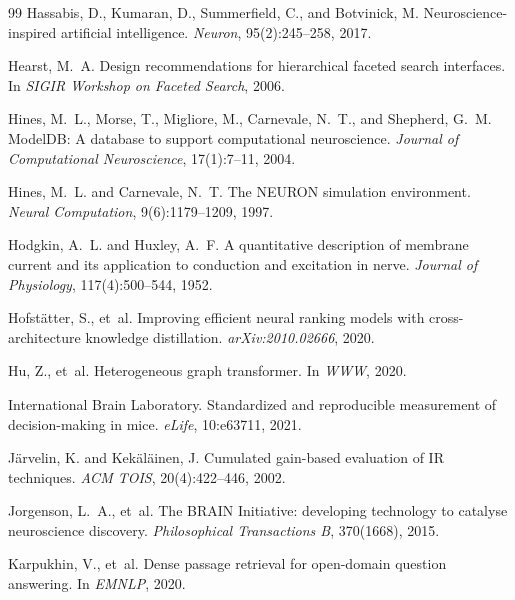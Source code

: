 \documentclass{article}
\theoremstyle{definition}
\begin{document}
\begin{thebibliography}{99}
Hassabis, D., Kumaran, D., Summerfield, C., and Botvinick, M.
\newblock Neuroscience-inspired artificial intelligence.
\newblock \emph{Neuron}, 95(2):245--258, 2017.

Hearst, M.~A.
\newblock Design recommendations for hierarchical faceted search interfaces.
\newblock In \emph{SIGIR Workshop on Faceted Search}, 2006.

Hines, M.~L., Morse, T., Migliore, M., Carnevale, N.~T., and Shepherd, G.~M.
\newblock ModelDB: A database to support computational neuroscience.
\newblock \emph{Journal of Computational Neuroscience}, 17(1):7--11, 2004.

Hines, M.~L. and Carnevale, N.~T.
\newblock The NEURON simulation environment.
\newblock \emph{Neural Computation}, 9(6):1179--1209, 1997.

Hodgkin, A.~L. and Huxley, A.~F.
\newblock A quantitative description of membrane current and its application to conduction and excitation in nerve.
\newblock \emph{Journal of Physiology}, 117(4):500--544, 1952.

Hofst{\"a}tter, S., et~al.
\newblock Improving efficient neural ranking models with cross-architecture knowledge distillation.
\newblock \emph{arXiv:2010.02666}, 2020.

Hu, Z., et~al.
\newblock Heterogeneous graph transformer.
\newblock In \emph{WWW}, 2020.

International Brain Laboratory.
\newblock Standardized and reproducible measurement of decision-making in mice.
\newblock \emph{eLife}, 10:e63711, 2021.

J{\"a}rvelin, K. and Kek{\"a}l{\"a}inen, J.
\newblock Cumulated gain-based evaluation of IR techniques.
\newblock \emph{ACM TOIS}, 20(4):422--446, 2002.

Jorgenson, L.~A., et~al.
\newblock The BRAIN Initiative: developing technology to catalyse neuroscience discovery.
\newblock \emph{Philosophical Transactions B}, 370(1668), 2015.

Karpukhin, V., et~al.
\newblock Dense passage retrieval for open-domain question answering.
\newblock In \emph{EMNLP}, 2020.


\end{thebibliography}
\end{document}

